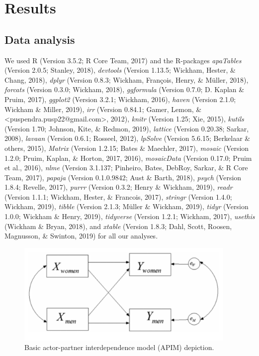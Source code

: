 \documentclass[man]{apa6}
\begin{document}
\section{Results}\label{results}

\subsection{Data analysis}\label{data-analysis}

We used R (Version 3.5.2; R Core Team, 2017) and the R-packages
\emph{apaTables} (Version 2.0.5; Stanley, 2018), \emph{devtools}
(Version 1.13.5; Wickham, Hester, \& Chang, 2018), \emph{dplyr} (Version
0.8.3; Wickham, François, Henry, \& Müller, 2018), \emph{forcats}
(Version 0.3.0; Wickham, 2018), \emph{ggformula} (Version 0.7.0; D.
Kaplan \& Pruim, 2017), \emph{ggplot2} (Version 3.2.1; Wickham, 2016),
\emph{haven} (Version 2.1.0; Wickham \& Miller, 2019), \emph{irr}
(Version 0.84.1; Gamer, Lemon, \&
\textless{}puspendra.pusp22@gmail.com\textgreater{}, 2012), \emph{knitr}
(Version 1.25; Xie, 2015), \emph{kutils} (Version 1.70; Johnson, Kite,
\& Redmon, 2019), \emph{lattice} (Version 0.20.38; Sarkar, 2008),
\emph{lavaan} (Version 0.6.1; Rosseel, 2012), \emph{lpSolve} (Version
5.6.15; Berkelaar \& others, 2015), \emph{Matrix} (Version 1.2.15; Bates
\& Maechler, 2017), \emph{mosaic} (Version 1.2.0; Pruim, Kaplan, \&
Horton, 2017, 2016), \emph{mosaicData} (Version 0.17.0; Pruim et al.,
2016), \emph{nlme} (Version 3.1.137; Pinheiro, Bates, DebRoy, Sarkar, \&
R Core Team, 2017), \emph{papaja} (Version 0.1.0.9842; Aust \& Barth,
2018), \emph{psych} (Version 1.8.4; Revelle, 2017), \emph{purrr}
(Version 0.3.2; Henry \& Wickham, 2019), \emph{readr} (Version 1.1.1;
Wickham, Hester, \& Francois, 2017), \emph{stringr} (Version 1.4.0;
Wickham, 2019), \emph{tibble} (Version 2.1.3; Müller \& Wickham, 2019),
\emph{tidyr} (Version 1.0.0; Wickham \& Henry, 2019), \emph{tidyverse}
(Version 1.2.1; Wickham, 2017), \emph{usethis} (Wickham \& Bryan, 2018),
and \emph{xtable} (Version 1.8.3; Dahl, Scott, Roosen, Magnusson, \&
Swinton, 2019) for all our analyses.

\begin{figure}
\includegraphics[width=400px]{APIM_figure} \caption{Basic actor-partner interdependence model (APIM) depiction.}\label{fig:apim}
\end{figure}
\end{document}
